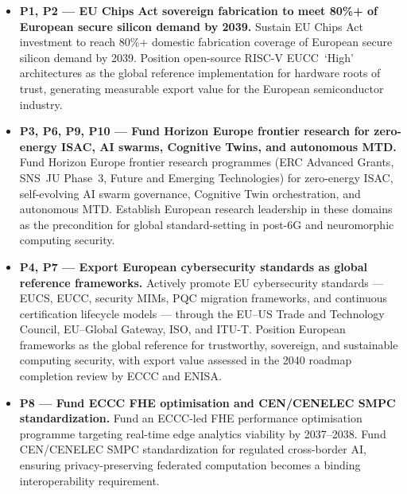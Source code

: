 \begin{itemize}

    \item \textbf{P1, P2 --- EU Chips Act sovereign fabrication to
    meet 80\%+ of European secure silicon demand by 2039.}
    Sustain EU Chips Act investment to reach 80\%+ domestic fabrication
    coverage of European secure silicon demand by 2039. Position
    open-source RISC-V EUCC~`High' architectures as the global
    reference implementation for hardware roots of trust, generating
    measurable export value for the European semiconductor industry.

    \item \textbf{P3, P6, P9, P10 --- Fund Horizon Europe frontier
    research for zero-energy ISAC, AI swarms, Cognitive Twins, and
    autonomous MTD.}
    Fund Horizon Europe frontier research programmes (ERC Advanced
    Grants, SNS~JU Phase~3, Future and Emerging Technologies) for
    zero-energy ISAC, self-evolving AI swarm governance, Cognitive
    Twin orchestration, and autonomous MTD. Establish European
    research leadership in these domains as the precondition for
    global standard-setting in post-6G and neuromorphic computing
    security.

    \item \textbf{P4, P7 --- Export European cybersecurity standards
    as global reference frameworks.}
    Actively promote EU cybersecurity standards --- EUCS, EUCC,
    security MIMs, PQC migration frameworks, and continuous
    certification lifecycle models --- through the EU--US Trade and
    Technology Council, EU--Global Gateway, ISO, and ITU-T.
    Position European frameworks as the global reference for
    trustworthy, sovereign, and sustainable computing security,
    with export value assessed in the 2040 roadmap completion
    review by ECCC and ENISA.

    \item \textbf{P8 --- Fund ECCC FHE optimisation and CEN/CENELEC
    SMPC standardization.}
    Fund an ECCC-led FHE performance optimisation programme targeting
    real-time edge analytics viability by 2037--2038. Fund
    CEN/CENELEC SMPC standardization for regulated cross-border AI,
    ensuring privacy-preserving federated computation becomes a
    binding interoperability requirement.

\end{itemize}

